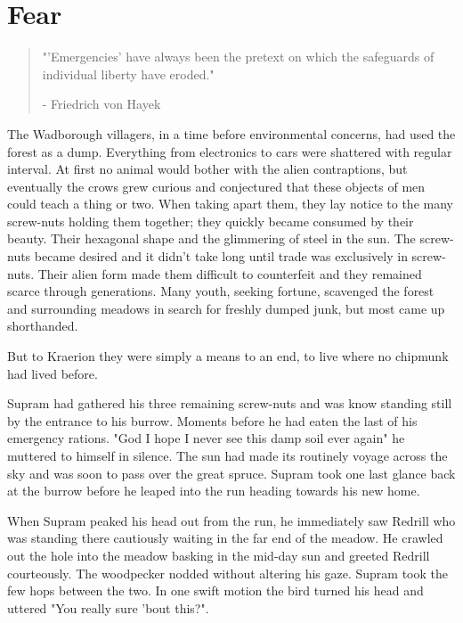 \documentclass[smalldemyvopaper,11pt,twoside,onecolumn,openright,extrafontsizes]{memoir}
\begin{document}
\chapter{Fear}

\vspace{-1.3cm}
\begin{localsize}{10}
	\begin{quote}
		"'Emergencies' have always been the pretext on which the safeguards of individual liberty have eroded."
		\begin{flushright}- Friedrich von Hayek\end{flushright}
	\end{quote} 
\end{localsize}
\vspace{1cm}

The Wadborough villagers, in a time before environmental concerns, had used the forest as a dump. Everything from electronics to cars were shattered with regular interval. At first no animal would bother with the alien contraptions, but eventually the crows grew curious and conjectured that these objects of men could teach a thing or two. When taking apart them, they lay notice to the many screw-nuts holding them together; they quickly became consumed by their beauty. Their hexagonal shape and the glimmering of steel in the sun. The screw-nuts became desired and it didn't take long until trade was exclusively in screw-nuts. Their alien form made them difficult to counterfeit and they remained scarce through generations. Many youth, seeking fortune, scavenged the forest and surrounding meadows in search for freshly dumped junk, but most came up shorthanded. 

But to Kraerion they were simply a means to an end, to live where no chipmunk had lived before. 

Supram had gathered his three remaining screw-nuts and was know standing still by the entrance to his burrow. Moments before he had eaten the last of his 
emergency rations. "God I hope I never see this damp soil ever again" he muttered to himself in silence. The sun had made its routinely voyage across the sky and was soon to pass over the great spruce. Supram took one last glance back at the burrow before he leaped into the run heading towards his new home. 

When Supram peaked his head out from the run, he immediately saw Redrill who was standing there cautiously waiting in the far end of the meadow. He crawled out the hole into the meadow basking in the mid-day sun and greeted Redrill courteously. The woodpecker nodded without altering his gaze. Supram took the few hops between the two. In one swift motion the bird turned his head and uttered "You really sure 'bout this?".\\
\end{document}
